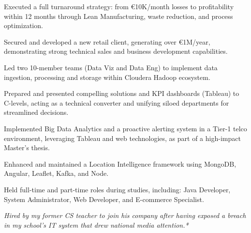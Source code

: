 \documentclass[]{deedy-resume-cv}
\begin{document}
\begin{minipage}[t]{0.60\textwidth}
\begin{tightemize}
\item Executed a full turnaround strategy: from €10K/month losses to profitability within 12 months through Lean Manufacturing, waste reduction, and process optimization.
\end{tightemize}

\sectionsep
{}
\begin{tightemize}
\item Secured and developed a new retail client, generating over €1M/year, demonstrating strong technical sales and business development capabilities.

\item Led two 10-member teams (Data Viz and Data Eng) to implement data ingestion, processing and storage within Cloudera Hadoop ecosystem.

\item Prepared and presented compelling solutions and KPI dashboards (Tableau) to C-levels, acting as a technical converter and unifying siloed departments for streamlined decisions.
\end{tightemize}

\sectionsep
{}
\begin{tightemize}
\item Implemented Big Data Analytics and a proactive alerting system in a Tier-1 telco environment, leveraging Tableau and web technologies, as part of a high-impact Master's thesis.

\item Enhanced and maintained a Location Intelligence framework using MongoDB, Angular, Leaflet, Kafka, and Node. 
\end{tightemize}

\sectionsep
{}
Held full-time and part-time roles during studies, including: Java Developer, System Administrator, Web Developer, and E-commerce Specialist.

\sectionsep
{}
\small{\textit{Hired by my former CS teacher to join his company after having exposed a breach in my school's IT system that drew national media attention.*}}

%
%
\end{minipage}
\end{document}
